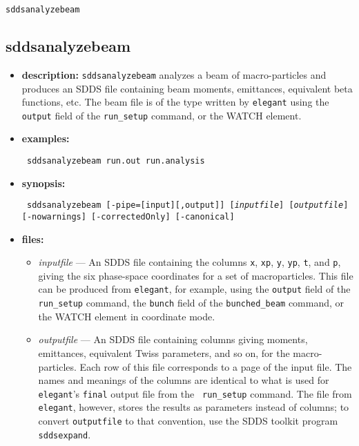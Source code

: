 \documentclass[11pt]{article}
\begin{document}
\begin{latexonly}
\newpage
\begin{center}{\Large\verb|sddsanalyzebeam|}\end{center}
\end{latexonly}
\subsection{sddsanalyzebeam}
\label{sddsanalyzebeam}

\begin{itemize}
\item {\bf description:} 
{\tt sddsanalyzebeam} analyzes a beam of macro-particles and produces an SDDS file
containing beam moments, emittances, equivalent beta functions, etc.  The beam file
is of the type written by {\tt elegant} using the {\tt output} field of the {\tt run\_setup}
command, or the WATCH element.

\item {\bf examples:}
\begin{flushleft}{\tt
sddsanalyzebeam run.out run.analysis 
}\end{flushleft}

\item {\bf synopsis:}
\begin{flushleft}{\tt
sddsanalyzebeam [-pipe=[input][,output]] [{\em inputfile}] [{\em outputfile}]
[-nowarnings] [-correctedOnly] [-canonical]
}\end{flushleft}

\item {\bf files:}
\begin{itemize}
\item {\em inputfile} --- An SDDS file containing the columns {\tt x}, {\tt xp}, {\tt y},
{\tt yp}, {\tt t}, and {\tt p}, giving the six phase-space coordinates for a set of macroparticles.
This file can be produced from {\tt elegant}, for example, using the {\tt output} field of the {\tt run\_setup} 
command, the {\tt bunch} field of the {\tt bunched\_beam} command, or the WATCH element in
coordinate mode.

\item {\em outputfile} --- An SDDS file containing columns giving
moments, emittances, equivalent Twiss parameters, and so on, for the
macro-particles.  Each row of this file corresponds to a page of the
input file.  The names and meanings of the columns are identical to
what is used for {\tt elegant}'s {\tt final} output file from the {\tt
run\_setup} command.  The file from {\tt elegant}, however, stores the
results as parameters instead of columns; to convert {\tt outputfile}
to that convention, use the SDDS toolkit program {\tt sddsexpand}.


\end{itemize}
\end{itemize}
\end{document}
